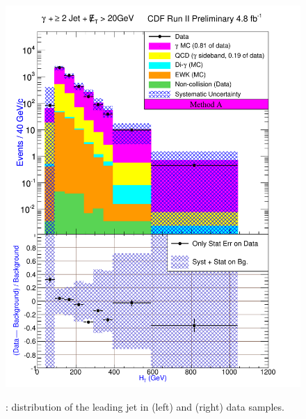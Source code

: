 \documentclass[11pt]{article}
\begin{document}
\begin{figure}[h!]
{ \includegraphics[scale=\resultsHistScale,keepaspectratio=true]{./g30jetmet20_MtdA_plot2_Ht.pdf}
}
 \caption{: \Ht distribution of the leading jet in \phoonejetmettwenty (left) and \photwojetmettwenty (right) data samples.}
 \label{fig:Result_MtdA_gj1Met20_Ht}
\end{figure}
\end{document}
